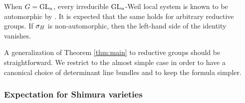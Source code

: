 \documentclass[reqno]{amsart}
\numberwithin{equation}{section}
\numberwithin{equation}{section}
\begin{document}
\begin{remark}
When $G=\operatorname{GL}_n$, every irreducible $\operatorname{GL}_n$-Weil local system is known to be automorphic by \cite{lafforgue2002chtoucas}. It is expected that the same holds for arbitrary reductive groups. If $\sigma_H$ is non-automorphic, then the left-hand side of the identity vanishes.
\end{remark}

\begin{remark}
    A generalization of Theorem \ref{thm:main} to reductive groups should be straightforward. We restrict to the almost simple case in order to have a canonical choice of determinant line bundles and to keep the formula simpler.
\end{remark}



\subsubsection{Expectation for Shimura varieties}\label{sec:shimura}
\end{document}
